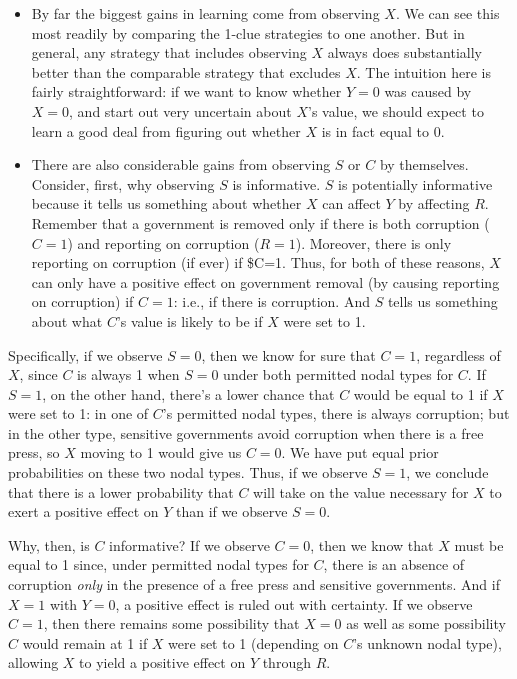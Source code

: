 \documentclass[
  12pt,
]{book}
\begin{document}
\begin{itemize}
\item
  By far the biggest gains in learning come from observing \(X\). We can see this most readily by comparing the 1-clue strategies to one another. But in general, any strategy that includes observing \(X\) always does substantially better than the comparable strategy that excludes \(X\). The intuition here is fairly straightforward: if we want to know whether \(Y=0\) was caused by \(X=0\), and start out very uncertain about \(X\)'s value, we should expect to learn a good deal from figuring out whether \(X\) is in fact equal to \(0\).
\item
  There are also considerable gains from observing \(S\) or \(C\) by themselves. Consider, first, why observing \(S\) is informative. \(S\) is potentially informative because it tells us something about whether \(X\) can affect \(Y\) by affecting \(R\). Remember that a government is removed only if there is both corruption (\(C=1\)) and reporting on corruption (\(R=1\)). Moreover, there is only reporting on corruption (if ever) if \$C=1. Thus, for both of these reasons, \(X\) can only have a positive effect on government removal (by causing reporting on corruption) if \(C=1\): i.e., if there is corruption. And \(S\) tells us something about what \(C\)'s value is likely to be if \(X\) were set to 1.
\end{itemize}

Specifically, if we observe \(S=0\), then we know for sure that \(C=1\), regardless of \(X\), since \(C\) is always 1 when \(S=0\) under both permitted nodal types for \(C\). If \(S=1\), on the other hand, there's a lower chance that \(C\) would be equal to 1 if \(X\) were set to 1: in one of \(C\)'s permitted nodal types, there is always corruption; but in the other type, sensitive governments avoid corruption when there is a free press, so \(X\) moving to 1 would give us \(C=0\). We have put equal prior probabilities on these two nodal types. Thus, if we observe \(S=1\), we conclude that there is a lower probability that \(C\) will take on the value necessary for \(X\) to exert a positive effect on \(Y\) than if we observe \(S=0\).

Why, then, is \(C\) informative? If we observe \(C=0\), then we know that \(X\) must be equal to 1 since, under permitted nodal types for \(C\), there is an absence of corruption \emph{only} in the presence of a free press and sensitive governments. And if \(X=1\) with \(Y=0\), a positive effect is ruled out with certainty. If we observe \(C=1\), then there remains some possibility that \(X=0\) as well as some possibility \(C\) would remain at 1 if \(X\) were set to 1 (depending on \(C\)'s unknown nodal type), allowing \(X\) to yield a positive effect on \(Y\) through \(R\).
\end{document}
